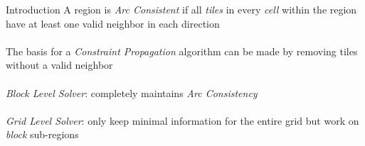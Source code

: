 \documentclass{beamer}
\begin{document}
  \begin{frame}[fragile]{Introduction}
    A region is \textit{Arc Consistent} if all \textit{tiles} in every \textit{cell} within the region have at least
    one valid neighbor in each direction
    \hfill \\
    \hfill \\
    The basis for a \textit{Constraint Propagation} algorithm
    can be made by removing tiles without a valid neighbor
    \hfill \\
    \hfill \\
    \textit{Block Level Solver}: completely maintains \textit{Arc Consistency}
    \hfill \\
    \hfill \\
    \textit{Grid Level Solver}: only keep minimal information for the entire grid but
        work on \textit{block} sub-regions

  \end{frame}


%
%
%
\end{document}
